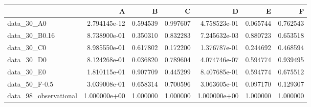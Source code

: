 \begin{tabular}{lrrrrrr}
\toprule
{} &             A &         B &         C &             D &         E &         F \\
\midrule
data\_30\_A0            &  2.794145e-12 &  0.594539 &  0.997607 &  4.758523e-01 &  0.065744 &  0.762543 \\
data\_30\_B0.16         &  8.738900e-01 &  0.350310 &  0.832283 &  7.245632e-03 &  0.880723 &  0.653518 \\
data\_30\_C0            &  8.985550e-01 &  0.617802 &  0.172200 &  1.376787e-01 &  0.244692 &  0.468594 \\
data\_30\_D0            &  8.124268e-01 &  0.036820 &  0.789604 &  4.074746e-07 &  0.594774 &  0.939495 \\
data\_30\_E0            &  1.810115e-01 &  0.907709 &  0.445299 &  8.407685e-01 &  0.594774 &  0.675512 \\
data\_50\_F-0.5         &  3.039008e-01 &  0.658314 &  0.700596 &  3.063605e-01 &  0.097170 &  0.129307 \\
data\_98\_observational &  1.000000e+00 &  1.000000 &  1.000000 &  1.000000e+00 &  1.000000 &  1.000000 \\
\bottomrule
\end{tabular}
